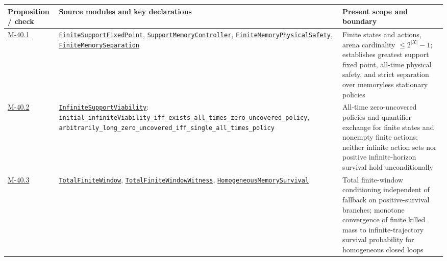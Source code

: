 \documentclass[
  english,
  11pt,
  oneside]{book}
\newcounter{none} %
\begin{document}
{\def\LTcaptype{none} %
\begin{longtable}[]{@{}
  >{\raggedright\arraybackslash}p{}
  >{\raggedright\arraybackslash}p{}
  >{\raggedright\arraybackslash}p{}@{}}
\toprule\noalign{}
\begin{minipage}[b]{\linewidth}\raggedright
Proposition / check
\end{minipage} & \begin{minipage}[b]{\linewidth}\raggedright
Source modules and key declarations
\end{minipage} & \begin{minipage}[b]{\linewidth}\raggedright
Present scope and boundary
\end{minipage} \\
\midrule\noalign{}
\endhead
\bottomrule\noalign{}
\endlastfoot
\hyperref[m-40-1]{M-40.1} & \href{../formalization/ueot-core/UEOT/V3/Compression/TheoryCompletion/UnifiedClosure/FiniteSupportFixedPoint.lean}{\nolinkurl{FiniteSupportFixedPoint}}, \href{../formalization/ueot-core/UEOT/V3/Compression/TheoryCompletion/UnifiedClosure/SupportMemoryController.lean}{\nolinkurl{SupportMemoryController}}, \href{../formalization/ueot-core/UEOT/V3/Compression/TheoryCompletion/UnifiedClosure/FiniteMemoryPhysicalSafety.lean}{\nolinkurl{FiniteMemoryPhysicalSafety}}, \href{../formalization/ueot-core/UEOT/V3/Compression/TheoryCompletion/UnifiedClosure/FiniteMemorySeparation.lean}{\nolinkurl{FiniteMemorySeparation}} & Finite states and actions, arena cardinality \(\le 2^{|X|}-1\); establishes greatest support fixed point, all-time physical safety, and strict separation over memoryless stationary policies \\
\hyperref[m-40-2]{M-40.2} & \href{../formalization/ueot-core/UEOT/V3/Compression/TheoryCompletion/UnifiedClosure/InfiniteSupportViability.lean}{\nolinkurl{InfiniteSupportViability}}: \nolinkurl{initial_infiniteViability_iff_exists_all_times_zero_uncovered_policy}, \nolinkurl{arbitrarily_long_zero_uncovered_iff_single_all_times_policy} & All-time zero-uncovered policies and quantifier exchange for finite states and nonempty finite actions; neither infinite action sets nor positive infinite-horizon survival hold unconditionally \\
\hyperref[m-40-3]{M-40.3} & \href{../formalization/ueot-core/UEOT/V3/Compression/TheoryCompletion/UnifiedClosure/TotalFiniteWindow.lean}{\nolinkurl{TotalFiniteWindow}}, \href{../formalization/ueot-core/UEOT/V3/Compression/TheoryCompletion/UnifiedClosure/TotalFiniteWindowWitness.lean}{\nolinkurl{TotalFiniteWindowWitness}}, \href{../formalization/ueot-core/UEOT/V3/Compression/TheoryCompletion/UnifiedClosure/HomogeneousMemorySurvival.lean}{\nolinkurl{HomogeneousMemorySurvival}} & Total finite-window conditioning independent of fallback on positive-survival branches; monotone convergence of finite killed mass to infinite-trajectory survival probability for homogeneous closed loops \\

\end{longtable}}
\end{document}
